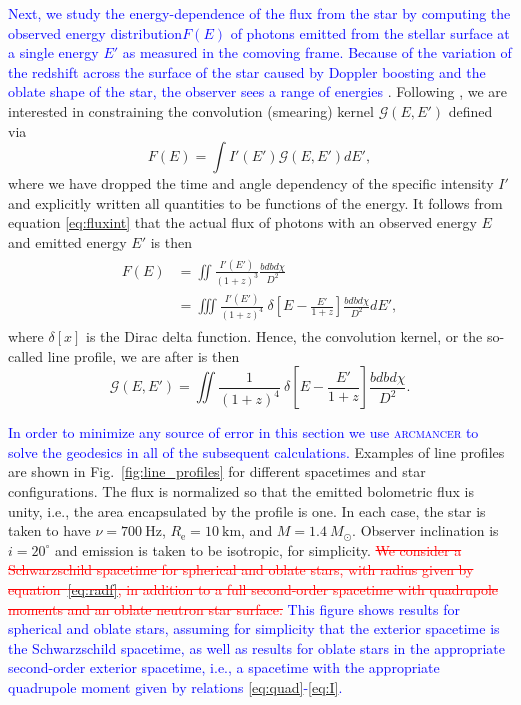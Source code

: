 \documentclass{aa}
\newcommand{\be}{\begin{equation}}
\newcommand{\ee}{\end{equation}}
\newcommand{\refe}[1]{\textcolor{blue}{{#1}}}
\newcommand{\refedel}[1]{\textcolor{red}{\sout{#1}}}
\newcommand{\sch}{Schwarzschild }
\newcommand{\Msun}{\ensuremath{M_{\odot}}}
\begin{document}
\refe{Next, we study the energy-dependence of the flux from the star by computing the observed energy distribution$ F(E)$ of photons emitted from the stellar surface at a single energy $E'$ as measured in the comoving frame. 
Because of the variation of the redshift across the surface of the star caused by Doppler boosting and the oblate shape of the star, the observer sees a range of energies} \citep{OP03,BML06,CMB06}.
Following \citealt{Baubock15}, we are interested in constraining the convolution (smearing) kernel $\mathcal{G}(E,E')$ defined via
\be
F(E) = \int I'(E') \mathcal{G}(E,E') dE',
\ee
where we have dropped the time and angle dependency of the specific intensity $I'$ and explicitly written all quantities to be functions of the energy.
It follows from equation \eqref{eq:fluxint} that the actual flux of photons with an observed energy $E$ and emitted energy $E'$ is then
\begin{align}\begin{split}
    F(E) &= \iint \frac{ I'(E') }{ (1+z)^3 } \frac{bdb d\chi}{D^2} \\
         &= \iiint \frac{I'(E') }{(1+z)^4} ~ \delta \left[ E - \frac{E'}{1+z} \right]  \frac{bdb d\chi}{D^2} dE',
\end{split}\end{align}
where $\delta[x]$ is the Dirac delta function.
Hence, the convolution kernel, or the so-called line profile, we are after is then 
\be
\mathcal{G}(E,E') =  \iint \frac{1}{(1+z)^4} ~\delta \left[E - \frac{E'}{1+z} \right]  \frac{bdb d\chi}{D^2}.
\ee

\refe{In order to minimize any source of error in this section we use \textsc{arcmancer} to solve the geodesics in all of the subsequent calculations.}
Examples of line profiles are shown in Fig.~\ref{fig:line_profiles} for different spacetimes and star configurations.
The flux is normalized so that the emitted bolometric flux is unity, i.e., the area encapsulated by the profile is one.
In each case, the star is taken to have $\nu = 700~\mathrm{Hz}$, $R_{\mathrm{e}} = 10~\mathrm{km}$, and $M=1.4~\Msun$.
Observer inclination is $i=20^{\circ}$ and emission is taken to be isotropic, for simplicity.
\refedel{We consider a \sch spacetime for spherical and oblate stars, with radius given by equation~\eqref{eq:radf}, in addition to a full second-order spacetime with quadrupole moments and an oblate neutron star surface.}
\refe{
This figure shows results for spherical and oblate stars, assuming for simplicity that the exterior spacetime is the Schwarzschild spacetime, as well as results for oblate stars in the appropriate second-order exterior spacetime, 
i.e., a spacetime with the appropriate quadrupole moment given by relations \eqref{eq:quad}-\eqref{eq:I}.
}
\end{document}
